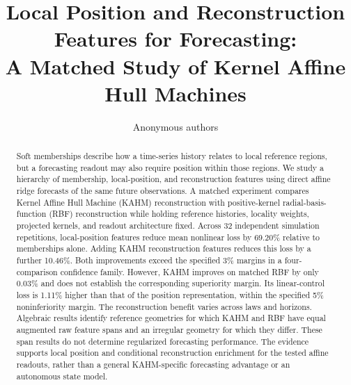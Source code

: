 \documentclass[10pt]{article}
\title{Local Position and Reconstruction Features for Forecasting:\\
A Matched Study of Kernel Affine Hull Machines}
\author{Anonymous authors}
\begin{document}
\maketitle
\begin{abstract}
Soft memberships describe how a time-series history relates to local reference regions, but a forecasting readout may also require position within those regions. We study a hierarchy of membership, local-position, and reconstruction features using direct affine ridge forecasts of the same future observations. A matched experiment compares Kernel Affine Hull Machine (KAHM) reconstruction with positive-kernel radial-basis-function (RBF) reconstruction while holding reference histories, locality weights, projected kernels, and readout architecture fixed. Across 32 independent simulation repetitions, local-position features reduce mean nonlinear loss by 69.20\% relative to memberships alone. Adding KAHM reconstruction features reduces this loss by a further 10.46\%. Both improvements exceed the specified 3\% margins in a four-comparison confidence family. However, KAHM improves on matched RBF by only 0.03\% and does not establish the corresponding superiority margin. Its linear-control loss is 1.11\% higher than that of the position representation, within the specified 5\% noninferiority margin. The reconstruction benefit varies across laws and horizons. Algebraic results identify reference geometries for which KAHM and RBF have equal augmented raw feature spans and an irregular geometry for which they differ. These span results do not determine regularized forecasting performance. The evidence supports local position and conditional reconstruction enrichment for the tested affine readouts, rather than a general KAHM-specific forecasting advantage or an autonomous state model.
\end{abstract}







\appendix

\end{document}
